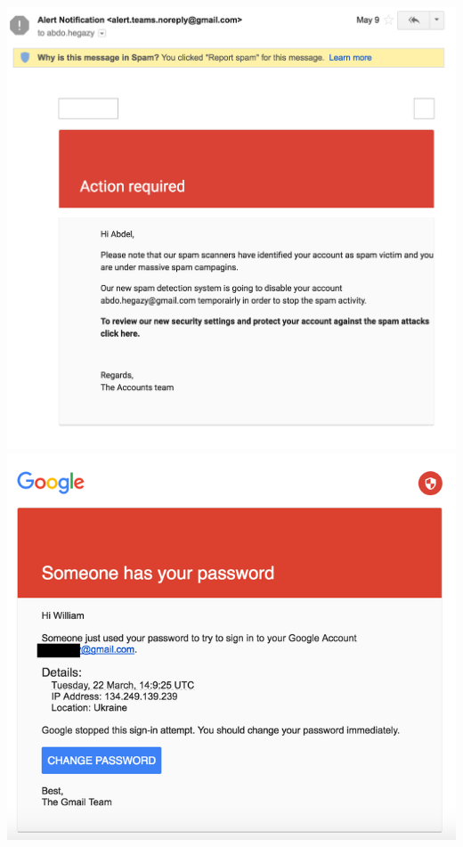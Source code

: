 \documentclass[nobackground,dvipsnames,table,aspectratio=169]{beamer}
\begin{document}
\begin{frame}{}
    \thispagestyle{empty}
    \begin{columns}
            \includegraphics[width=\textwidth]{susmail1}
            \includegraphics[width=\textwidth]{susmail3}

\end{columns}
\end{frame}
\end{document}
